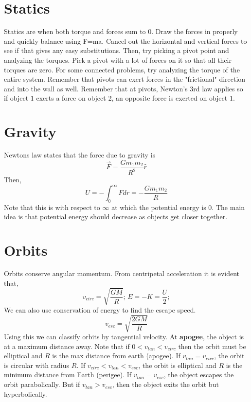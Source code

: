 \documentclass{article}
\begin{document}
\section{Statics}
    Statics are when both torque and forces sum to 0. Draw the forces in properly and quickly balance using F=ma. Cancel out the horizontal and vertical forces to see
    if that gives any easy substitutions. Then, try picking a pivot point and analyzing the torques. Pick a pivot with
    a lot of forces on it so that all their torques are zero. For some connected problems, try analyzing the torque of 
    the entire system. Remember that pivots can exert forces in the "frictional" direction and into the wall as well. 
    Remember that at pivots, Newton's 3rd law applies so if object 1 exerts a force on object 2, an opposite force is 
    exerted on object 1.

\section{Gravity}
    Newtons law states that the force due to gravity is 
    $$\vec{F}=\frac{Gm_{1}m_{2}}{R^{2}}\hat{r}$$
    Then, 
    $$U=-\int_{0}^{\infty}Fdr=-\frac{Gm_{1}m_{2}}{R}$$
    Note that this is with respect to $\infty$ at which the potential energy is 0.
    The main idea is that potential energy should decrease as objects get closer together.

\section{Orbits}
    Orbits conserve angular momentum. From centripetal acceleration it is evident that,
    $$v_{circ}=\sqrt{\frac{GM}{R}};\, E=-K=\frac{U}{2};$$
    We can also use conservation of energy to find the escape speed.
    $$v_{esc}=\sqrt{\frac{2GM}{R}}$$
    Using this we can classify orbits by tangential velocity. At \textbf{apogee}, the object is at a maximum distance away.
    Note that if $0<v_{tan}<v_{circ}$ then the orbit must be elliptical and $R$ is the max distance from earth (apogee).
    If $v_{tan}=v_{circ}$, the orbit is circular with radius $R$. If $v_{circ}<v_{tan}<v_{esc}$, the orbit is elliptical and 
    $R$ is the minimum distance from Earth (perigee). If $v_{tan}=v_{esc}$, the object escapes the orbit parabolically.
    But if $v_{tan}>v_{esc}$, then the object exits the orbit but hyperbolically.
\end{document}
